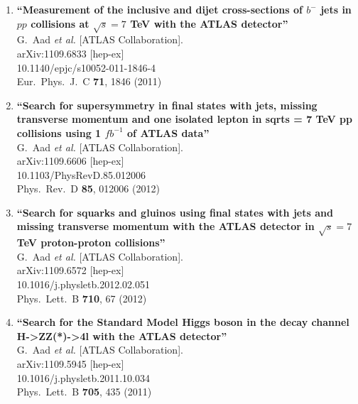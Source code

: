 \documentclass{article}
\begin{document}
\begin{enumerate}
\item%
{\bf ``Measurement of the inclusive and dijet cross-sections of $b^-$ jets in $pp$ collisions at $\sqrt{s}=7$ TeV with the ATLAS detector''}
  \\{}G.~Aad {\it et al.}  [ATLAS Collaboration].
  \\{}arXiv:1109.6833 [hep-ex]
    \\{}10.1140/epjc/s10052-011-1846-4
\\{}Eur.\ Phys.\ J.\ C {\bf 71}, 1846 (2011) %


\item%
{\bf ``Search for supersymmetry in final states with jets, missing transverse momentum and one isolated lepton in sqrt{s} = 7 TeV pp collisions using 1 $fb^{-1}$ of ATLAS data''}
  \\{}G.~Aad {\it et al.}  [ATLAS Collaboration].
  \\{}arXiv:1109.6606 [hep-ex]
    \\{}10.1103/PhysRevD.85.012006
\\{}Phys.\ Rev.\ D {\bf 85}, 012006 (2012) %


\item%
{\bf ``Search for squarks and gluinos using final states with jets and missing transverse momentum with the ATLAS detector in $\sqrt{s}=7$ TeV proton-proton collisions''}
  \\{}G.~Aad {\it et al.}  [ATLAS Collaboration].
  \\{}arXiv:1109.6572 [hep-ex]
    \\{}10.1016/j.physletb.2012.02.051
\\{}Phys.\ Lett.\ B {\bf 710}, 67 (2012) %


\item%
{\bf ``Search for the Standard Model Higgs boson in the decay channel H->ZZ(*)->4l with the ATLAS detector''}
  \\{}G.~Aad {\it et al.}  [ATLAS Collaboration].
  \\{}arXiv:1109.5945 [hep-ex]
    \\{}10.1016/j.physletb.2011.10.034
\\{}Phys.\ Lett.\ B {\bf 705}, 435 (2011) %



\end{enumerate}
\end{document}
